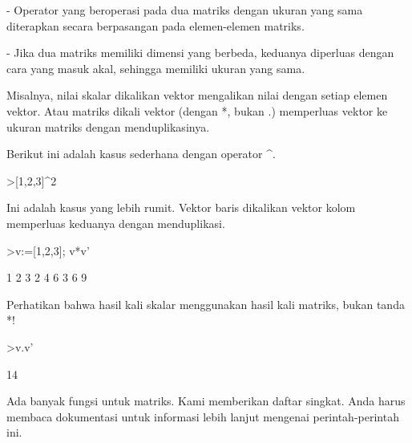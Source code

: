 \documentclass[a4paper,10pt]{article}
\begin{document}
\begin{eulernotebook}
\begin{eulercomment}
- Operator yang beroperasi pada dua matriks dengan ukuran yang sama
diterapkan secara berpasangan pada elemen-elemen matriks.

- Jika dua matriks memiliki dimensi yang berbeda, keduanya diperluas
dengan cara yang masuk akal, sehingga memiliki ukuran yang sama.

Misalnya, nilai skalar dikalikan vektor mengalikan nilai dengan setiap
elemen vektor. Atau matriks dikali vektor (dengan *, bukan .)
memperluas vektor ke ukuran matriks dengan menduplikasinya.

Berikut ini adalah kasus sederhana dengan operator \textasciicircum{}.
\end{eulercomment}
\begin{eulerprompt}
>[1,2,3]^2
\end{eulerprompt}
\begin{euleroutput}
  [1,  4,  9]
\end{euleroutput}
\begin{eulercomment}
Ini adalah kasus yang lebih rumit. Vektor baris dikalikan vektor kolom
memperluas keduanya dengan menduplikasi.
\end{eulercomment}
\begin{eulerprompt}
>v:=[1,2,3]; v*v'
\end{eulerprompt}
\begin{euleroutput}
              1             2             3 
              2             4             6 
              3             6             9 
\end{euleroutput}
\begin{eulercomment}
Perhatikan bahwa hasil kali skalar menggunakan hasil kali matriks,
bukan tanda *!
\end{eulercomment}
\begin{eulerprompt}
>v.v'
\end{eulerprompt}
\begin{euleroutput}
  14
\end{euleroutput}
\begin{eulercomment}
Ada banyak fungsi untuk matriks. Kami memberikan daftar singkat. Anda
harus membaca dokumentasi untuk informasi lebih lanjut mengenai
perintah-perintah ini.


\end{eulercomment}
\end{eulernotebook}
\end{document}
